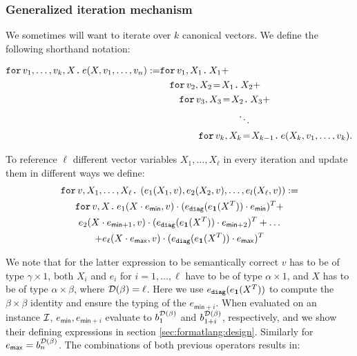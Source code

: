 \subsubsection{Generalized iteration mechanism}\label{subsubsec:generalloop}
 We sometimes will want to iterate over $k$ canonical vectors. We define the following shorthand notation:

\begin{align*}
  \ffor{v_1,\ldots, v_k}{X}{e(X,v_1,\ldots, v_n)}:= &\ffor{v_1}{X_1}{X_1 +} \\
  &\hspace{1em}\initf{X_1}{v_2}{X_2}{X_2 + } \\
  &\hspace{2em}\initf{X_2}{v_3}{X_3}{X_3 + } \\
  &\hspace{8em}\ddots \\
  &\hspace{4em}\initf{X_{k-1}}{v_k}{X_k}{ e(X_k,v_1,\ldots, v_k)}.
\end{align*}

To reference $\ell$ different vector variables $X_1,\ldots,X_\ell$ in every iteration and update them in different ways we define:
\begin{multline*}
\ffor{v}{X_1,\ldots, X_\ell}{\left( e_1(X_1,v), e_2(X_2,v), \ldots, e_l(X_\ell,v) \right)} := \\
\ffor{v}{X}{e_1(X\cdot e_{\mathsf{min}},v)\cdot (e_{\diag}(e_{\ones}(X^T))\cdot e_{\mathsf{min}})^T +\\ e_2(X\cdot e_{\mathsf{min} + 1},v)\cdot (e_{\diag}(e_{\ones}(X^T))\cdot e_{\mathsf{min} + 2})^T + \ldots \\
+ e_\ell(X\cdot e_{\mathsf{max}},v)\cdot (e_{\diag}(e_{\ones}(X^T))\cdot e_{\mathsf{max}})^T} \\
\end{multline*}

We note that for the latter expression to be semantically correct $v$ has to be of type $\gamma\times 1$, 
both $X_i$ and $e_i$ for $ i=1,\ldots,\ell$ have to be of type $\alpha\times 1$, 
and $X$ has to be of type $\alpha\times\beta$, where $\dom(\beta)=\ell$. Here
we use $e_{\diag}(e_{\ones}(X^T))$ to compute the $\beta\times\beta$ identity and ensure the typing of the
$e_{\mathsf{min} + i}$.
When evaluated on an instance $\I$,
$e_{\mathsf{min}}, e_{\mathsf{min} + i}$ evaluate to $b_1^{\dom(\beta)}$ and $b_{1+i}^{\dom(\beta)}$, 
respectively, and we show their defining expressions in section \ref{sec:formatlang:design}.
Similarly for $e_{\mathsf{max}}=b_n^{\dom(\beta)}$.
The combinations of both previous operators results in:

